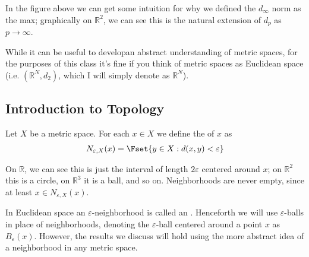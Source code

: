 \documentclass{article}
\begin{document}
\begin{enumerate}
\begin{figure}[H]
    \end{figure}

    In the figure above we can get some intuition for why we defined the $d_{\infty}$ norm as the max; graphically on $\mathbb{R}^2$, we can see this is the natural extension of $d_p$ as $p \to \infty$.
\end{enumerate}

While it can be useful to developan abstract understanding of metric spaces, for the purposes of this class it's fine if you think of metric spaces as Euclidean space (i.e. $(\mathbb{R}^N, d_2)$, which I will simply denote as $\mathbb{R}^N$).

\subsection{Introduction to Topology}
\label{sub:introduction_to_topology}

\begin{definition}\label{def:lecture1_neighborhood}
  Let $X$ be a metric space. For each $x \in X$ we define the  of $x$ as
  \begin{align*}
    N_{\varepsilon, X}(x) = \Fset{y \in X: d(x, y) < \varepsilon}
  \end{align*}
\end{definition}

On $\mathbb{R}$, we can see this is just the interval of length $2\varepsilon$ centered around $x$; on $\mathbb{R}^2$ this is a circle, on $\mathbb{R}^3$ it is a ball, and so on. Neighborhoods are never empty, since at least $x \in N_{\varepsilon, X}(x)$.
\begin{remark}
  In Euclidean space an $\varepsilon$-neighborhood is called an . Henceforth we will use $\varepsilon$-balls in place of neighborhoods, denoting the $\varepsilon$-ball centered around a point $x$ as $B_{\varepsilon}(x)$. However, the results we discuss will hold using the more abstract idea of a neighborhood in any metric space.
\end{remark}
\end{document}
